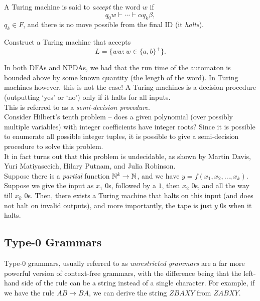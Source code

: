 	\begin{definition}
		A Turing machine is said to \emph{accept} the word $w$ if
		\[ q_0 w \vdash \cdots \vdash \alpha q_k\beta, \]
		$q_k \in F$, and there is no move possible from the final ID (it \emph{halts}).
	\end{definition}

	\begin{exercise}
		Construct a Turing machine that accepts
		\[ L = \{ ww : w \in \{a,b\}^+ \}. \]
	\end{exercise}

	In both DFAs and NPDAs, we had that the run time of the automaton is bounded above by some known quantity (the length of the word). In Turing machines however, this is not the case! A Turing machines is a decision procedure (outputting `yes' or `no') only if it halts for all inputs.\\
	This is referred to as a \emph{semi-decision procedure}.\\

	Consider Hilbert's tenth problem -- does a given polynomial (over possibly multiple variables) with integer coefficients have integer roots? Since it is possible to enumerate all possible integer tuples, it is possible to give a semi-decision procedure to solve this problem.\\
	It in fact turns out that this problem is undecidable, as shown by Martin Davis, Yuri Matiyasecich, Hilary Putnam, and Julia Robinson.\\

	Suppose there is a \emph{partial} function $\mathbb{N}^k \to \mathbb{N}$, and we have $y = f(x_1,x_2,\ldots,x_k)$. Suppose we give the input as $x_1$ $0$s, followed by a $1$, then $x_2$ $0$s, and all the way till $x_k$ $0$s. Then, there exists a Turing machine that halts on this input (and does not halt on invalid outputs), and more importantly, the tape is just $y$ $0$s when it halts.


\subsection{Type-\texorpdfstring{0}{$0$} Grammars}

	Type-$0$ grammars, usually referred to as \emph{unrestricted grammars} are a far more powerful version of context-free grammars, with the difference being that the left-hand side of the rule can be a string instead of a single character. For example, if we have the rule $AB \to BA$, we can derive the string $ZBAXY$ from $ZABXY$.

